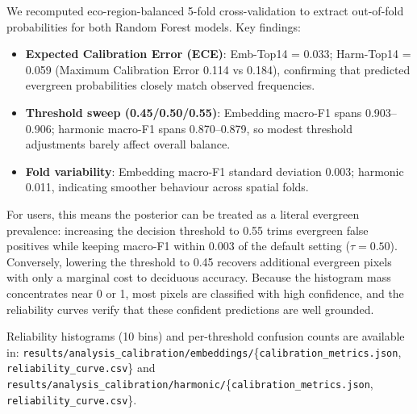 \documentclass[utf8]{frontiers_suppmat}
\begin{document}
We recomputed eco-region-balanced 5-fold cross-validation to extract out-of-fold probabilities for both Random Forest models. Key findings:

\begin{itemize}
    \item \textbf{Expected Calibration Error (ECE)}: Emb-Top14 = 0.033; Harm-Top14 = 0.059 (Maximum Calibration Error 0.114 vs 0.184), confirming that predicted evergreen probabilities closely match observed frequencies.
    \item \textbf{Threshold sweep (0.45/0.50/0.55)}: Embedding macro-F1 spans 0.903–0.906; harmonic macro-F1 spans 0.870–0.879, so modest threshold adjustments barely affect overall balance.
    \item \textbf{Fold variability}: Embedding macro-F1 standard deviation 0.003; harmonic 0.011, indicating smoother behaviour across spatial folds.
\end{itemize}

For users, this means the posterior can be treated as a literal evergreen prevalence: increasing the decision threshold to 0.55 trims evergreen false positives while keeping macro-F1 within 0.003 of the default setting (\(\tau = 0.50\)). Conversely, lowering the threshold to 0.45 recovers additional evergreen pixels with only a marginal cost to deciduous accuracy. Because the histogram mass concentrates near 0 or 1, most pixels are classified with high confidence, and the reliability curves verify that these confident predictions are well grounded.

Reliability histograms (10 bins) and per-threshold confusion counts are available in: \texttt{results/analysis\_calibration/embeddings/}\{\texttt{calibration\_metrics.json}, \texttt{reliability\_curve.csv}\} and \texttt{results/analysis\_calibration/harmonic/}\{\texttt{calibration\_metrics.json}, \texttt{reliability\_curve.csv}\}.
\end{document}
